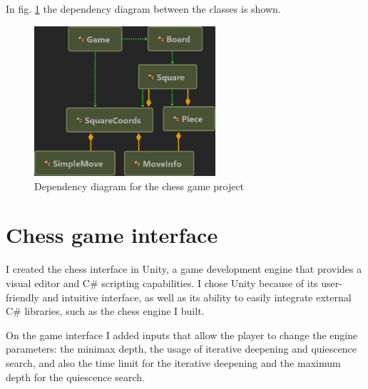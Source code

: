 In fig. \ref{fig:depDiagram} the dependency diagram between the classes is shown.

\begin{figure}[h]
    \centering
    \includegraphics[width=0.6\textwidth]{figures/dependency-diagram-chess-game.png}
    \caption{Dependency diagram for the chess game project}
    \label{fig:depDiagram}
\end{figure}

\section{Chess game interface}
\label{sec:ch5sec2}

I created the chess interface in Unity, a game development engine that provides a visual editor and C\# scripting capabilities. I chose Unity because of its user-friendly and intuitive interface, as well as its ability to easily integrate external C\# libraries, such as the chess engine I built.

On the game interface I added inputs that allow the player to change the engine parameters: the minimax depth, the usage of iterative deepening and quiescence search, and also the time limit for the iterative deepening and the maximum depth for the quiescence search.